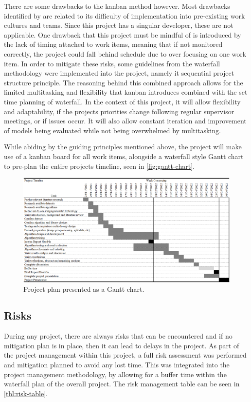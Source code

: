 There are some drawbacks to the kanban method however. Most drawbacks identified by \cite{ahmad2013kanban} are related to its difficulty of implementation into pre-existing work cultures and teams. Since this project has a singular developer, these are not applicable. One drawback that this project must be mindful of is introduced by the lack of timing attached to work items, meaning that if not monitored correctly, the project could fall behind schedule due to over focusing on one work item. In order to mitigate these risks, some guidelines from the waterfall methodology were implemented into the project, namely it sequential project structure principle. The reasoning behind this combined approach allows for the limited multitasking and flexibility that kanban introduces combined with the set time planning of waterfall. In the context of this project, it will allow flexibility and adaptability, if the projects priorities change following regular supervisor meetings, or if issues occur. It will also allow constant iteration and improvement of models being evaluated while not being overwhelmed by multitasking.

While abiding by the guiding principles mentioned above, the project will make use of a kanban board for all work items, alongside a waterfall style Gantt chart to pre-plan the entire projects timeline, seen in \autoref{fig:gantt-chart}.

\begin{figure}[H]
    \centering
    \includegraphics[width=\textwidth]{figures/gantt-chart.png}
    \caption{Project plan presented as a Gantt chart.}
    \label{fig:gantt-chart}
\end{figure}

\subsection{Risks}
During any project, there are always risks that can be encountered and if no mitigation plan is in place, then it can lead to delays in the project. As part of the project management within this project, a full risk assessment was performed and mitigation planned to avoid any lost time. This was integrated into the project management methodology, by allowing for a buffer time within the waterfall plan of the overall project. The risk management table can be seen in \autoref{tbl:risk-table}.

